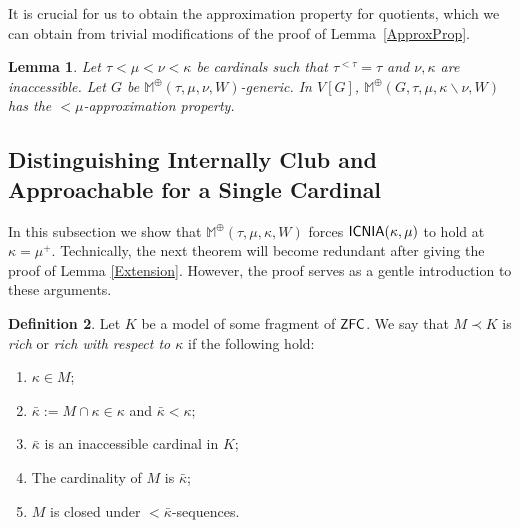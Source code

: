 \documentclass[a4paper]{amsart}
\theoremstyle{definition}
\newtheorem{mydef}{Definition}[section]
\theoremstyle{remark}
\theoremstyle{plain}
\newtheorem{mylem}[mydef]{Lemma}
\numberwithin{mydef}{section}
\DeclareMathOperator{\ICNIA}{\textup{\textsf{ICNIA}}}
\newcommand{\dM}{\mathbb{M}}
\begin{document}
	
	


It is crucial for us to obtain the approximation property for quotients, which we can obtain from trivial modifications of the proof of Lemma~\autoref{ApproxProp}. 


	
	\begin{mylem}\label{quotient-approx}
		Let $\tau<\mu<\nu<\kappa$ be cardinals such that $\tau^{<\tau}=\tau$ and $\nu,\kappa$ are inaccessible. Let $G$ be $\dM^\oplus(\tau,\mu,\nu,W)$-generic. In $V[G]$, $\dM^\oplus(G,\tau,\mu,\kappa\smallsetminus\nu,W)$ has the $<\mu$-approximation property.
	\end{mylem}
	

\subsection{Distinguishing Internally Club and Approachable for a Single Cardinal}
	
	In this subsection we show that $\dM^\oplus(\tau,\mu,\kappa,W)$ forces $\ICNIA(\kappa,\mu)$ to hold at $\kappa=\mu^+$. Technically, the next theorem will become redundant after giving the proof of Lemma \ref{Extension}. However, the proof serves as a gentle introduction to these arguments.
	

	
	\begin{mydef}\cite{Harrington-Shelah1985} Let $K$ be a model of some fragment of $\textup{\textsf{ZFC}}$. We say that $M \prec K$ is \emph{rich} or \emph{rich with respect to $\kappa$} if the following hold: 

\begin{enumerate}
\item $\kappa \in M$;
\item $\bar{\kappa}:=M \cap \kappa \in \kappa$ and $\bar{\kappa}<\kappa$;
\item $\bar \kappa$ is an inaccessible cardinal in $K$;
\item The cardinality of $M$ is $\bar{\kappa}$;
\item $M$ is closed under $<\!\bar{\kappa}$-sequences.
\end{enumerate}
	 \end{mydef}
	 
\end{document}

